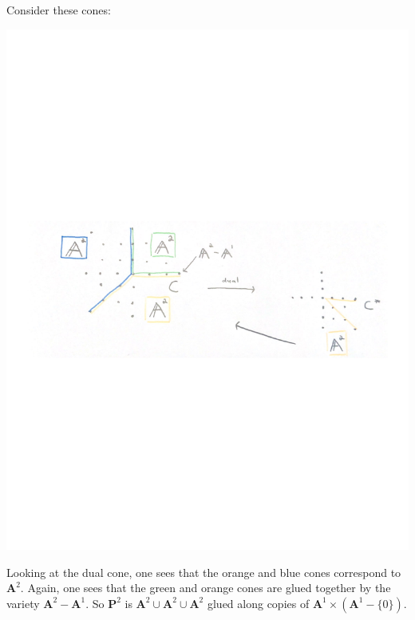 \documentclass [11 pt, oneside] {article}
\begin{document}
Consider these cones:
\begin{center}
	{\includegraphics[scale=0.8]{images/toric_proj_plane.pdf}}
\end{center}
Looking at the dual cone, one sees that the orange and blue cones correspond to $\mathbf{A}^2$.  Again, one sees that the green and orange cones are glued together by the variety $\mathbf{A}^2 - \mathbf{A}^1$. So $\mathbf{P}^2$ is $\mathbf{A}^2\cup \mathbf{A}^2\cup \mathbf{A}^2$ glued along copies of $\mathbf{A}^1\times (\mathbf{A}^1-\{0\})$.
\end{document}

